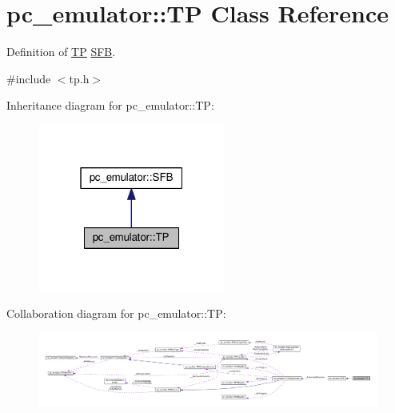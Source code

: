 \hypertarget{classpc__emulator_1_1TP}{}\section{pc\+\_\+emulator\+:\+:TP Class Reference}
\label{classpc__emulator_1_1TP}


Definition of \hyperlink{classpc__emulator_1_1TP}{TP} \hyperlink{classpc__emulator_1_1SFB}{S\+FB}.  




{\ttfamily \#include $<$tp.\+h$>$}



Inheritance diagram for pc\+\_\+emulator\+:\+:TP\+:\nopagebreak
\begin{figure}[H]
\begin{center}
\leavevmode
\includegraphics[width=175pt]{classpc__emulator_1_1TP__inherit__graph}
\end{center}
\end{figure}


Collaboration diagram for pc\+\_\+emulator\+:\+:TP\+:\nopagebreak
\begin{figure}[H]
\begin{center}
\leavevmode
\includegraphics[width=350pt]{classpc__emulator_1_1TP__coll__graph}
\end{center}
\end{figure}
